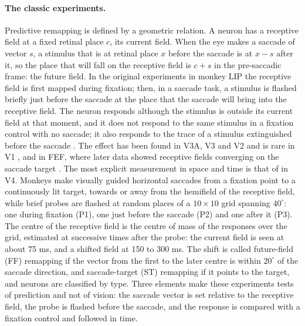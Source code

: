 \documentclass[14pt]{article}
\begin{document}
\paragraph{The classic experiments.}
Predictive remapping is defined by a geometric relation.
A neuron has a receptive field at a fixed retinal place $c$, its current field.
When the eye makes a saccade of vector $s$, a stimulus that is at retinal place $x$ before the saccade is at $x-s$ after it, so the place that will fall on the receptive field is $c+s$ in the pre-saccadic frame: the future field.
In the original experiments in monkey LIP the receptive field is first mapped during fixation; then, in a saccade task, a stimulus is flashed briefly just before the saccade at the place that the saccade will bring into the receptive field.
The neuron responds although the stimulus is outside its current field at that moment, and it does not respond to the same stimulus in a fixation control with no saccade; it also responds to the trace of a stimulus extinguished before the saccade \citep{duhamelUpdatingRepresentationVisual1992,colbySpaceAttentionParietal1999}.
The effect has been found in V3A, V3 and V2 and is rare in V1 \citep{nakamuraUpdatingVisualRepresentation2002}, and in FEF, where later data showed receptive fields converging on the saccade target \citep{umenoSpatialProcessingMonkey1997,zirnsakVisualSpaceCompressed2014}.
The most explicit measurement in space and time is that of \citet{neupaneTwoDistinctTypes2016} in V4.
Monkeys make visually guided horizontal saccades from a fixation point to a continuously lit target, towards or away from the hemifield of the receptive field, while brief probes are flashed at random places of a $10\times10$ grid spanning $40^{\circ}$: one during fixation (P1), one just before the saccade (P2) and one after it (P3).
The centre of the receptive field is the centre of mass of the responses over the grid, estimated at successive times after the probe: the current field is seen at about 75 ms, and a shifted field at 150 to 300 ms.
The shift is called future-field (FF) remapping if the vector from the first to the later centre is within $20^{\circ}$ of the saccade direction, and saccade-target (ST) remapping if it points to the target, and neurons are classified by type.
Three elements make these experiments tests of prediction and not of vision: the saccade vector is set relative to the receptive field, the probe is flashed before the saccade, and the response is compared with a fixation control and followed in time.
\end{document}
